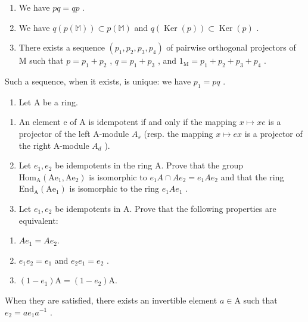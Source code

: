 \begin{enumerate}
\def\labelenumi{(\roman{enumi})}
\item
  We have \(pq = qp\) .
\item
  We have \(q(p(\mathbb{M})) \subset p(\mathbb{M})\) and \(q(\operatorname{Ker}(p)) \subset \operatorname{Ker}(p)\) .
\item
  There exists a sequence \((p_1, p_2, p_3, p_4)\) of pairwise orthogonal projectors of M such that \(p = p_1 + p_2\) , \(q = p_1 + p_3\) , and \(1_{\mathrm{M}} = p_1 + p_2 + p_3 + p_4\) .
\end{enumerate}

Such a sequence, when it exists, is unique: we have \(p_{1} = pq\) .

\begin{enumerate}
\def\labelenumi{\arabic{enumi})}
\setcounter{enumi}{4}
\tightlist
\item
  Let \(\mathrm{A}\) be a ring.
\end{enumerate}

\begin{enumerate}
\def\labelenumi{\alph{enumi})}
\item
  An element e of A is idempotent if and only if the mapping \(x \mapsto xe\) is a projector of the left A-module \(A_{s}\) (resp. the mapping \(x \mapsto ex\) is a projector of the right A-module \(A_{d}\) ).
\item
  Let \(e_{1}, e_{2}\) be idempotents in the ring A. Prove that the group \(\mathrm{Hom}_{\mathrm{A}}(\mathrm{Ae}_{1}, \mathrm{Ae}_{2})\) is isomorphic to \(e_{1}A \cap Ae_{2} = e_{1}Ae_{2}\) and that the ring \(\mathrm{End}_{\mathrm{A}}(\mathrm{Ae}_{1})\) is isomorphic to the ring \(e_{1}Ae_{1}\) .
\item
  Let \(e_1, e_2\) be idempotents in A. Prove that the following properties are equivalent:
\end{enumerate}

\begin{enumerate}
\def\labelenumi{(\roman{enumi})}
\item
  \(Ae_{1} = Ae_{2}.\)
\item
  \(e_{1}e_{2}=e_{1}\) and \(e_{2}e_{1}=e_{2}\) .
\item
  \((1 - e_{1})\mathrm{A} = (1 - e_{2})\mathrm{A}.\)
\end{enumerate}

When they are satisfied, there exists an invertible element \(a \in \mathrm{A}\) such that \(e_2 = ae_1a^{-1}\) .

